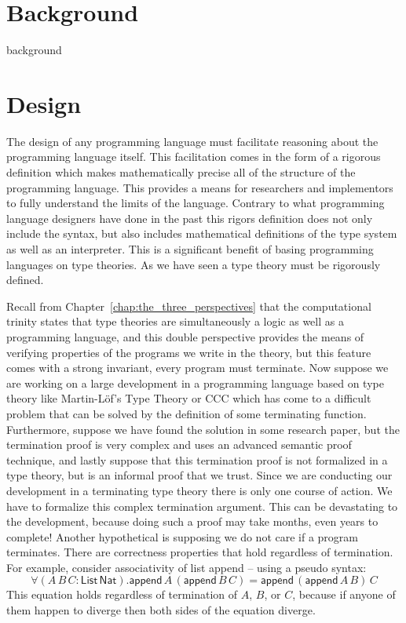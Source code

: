 \documentclass[phd,appendix,dedicationpage,ackpage,epigraphpage]{uithesis}
\begin{document}
\part{Background}          
\label{part:background}
{background}

\part{Design}
\label{part:design}
The design of any programming language must facilitate reasoning about
the programming language itself.  This facilitation comes in the form
of a rigorous definition which makes mathematically precise all of the
structure of the programming language.  This provides a means for
researchers and implementors to fully understand the limits of the
language.  Contrary to what programming language designers have done
in the past this rigors definition does not only include the syntax,
but also includes mathematical definitions of the type system as well
as an interpreter. This is a significant benefit of basing programming
languages on type theories.  As we have seen a type theory must be
rigorously defined.  

Recall from Chapter~\ref{chap:the_three_perspectives} that the
computational trinity states that type theories are simultaneously a
logic as well as a programming language, and this double perspective
provides the means of verifying properties of the programs we write in
the theory, but this feature comes with a strong invariant, every
program must terminate.  Now suppose we are working on a large
development in a programming language based on type theory like
Martin-L\"of's Type Theory or CCC which has come to a difficult
problem that can be solved by the definition of some terminating
function.  Furthermore, suppose we have found the solution in some
research paper, but the termination proof is very complex and uses an
advanced semantic proof technique, and lastly suppose that this
termination proof is not formalized in a type theory, but is an
informal proof that we trust.  Since we are conducting our development
in a terminating type theory there is only one course of action.  We
have to formalize this complex termination argument. This can be
devastating to the development, because doing such a proof may take
months, even years to complete!  Another hypothetical is supposing we
do not care if a program terminates.  There are correctness properties
that hold regardless of termination.  For example, consider
associativity of list append -- using a pseudo syntax:
\[ \forall (A\,B\,C :
\mathsf{List}\,\mathsf{Nat}).\mathsf{append}\,A\,(\mathsf{append}\,B\,C)
= \mathsf{append}\,(\mathsf{append}\,A\,B)\,C \] This equation holds
regardless of termination of $A$, $B$, or $C$, because if anyone of
them happen to diverge then both sides of the equation diverge.  
\end{document}
